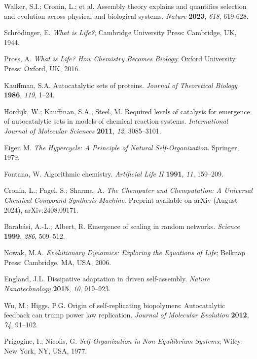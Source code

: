 \documentclass[preprint,12pt]{elsarticle}
\begin{document}
\begin{thebibliography}{999}
Walker, S.I.; Cronin, L.; et al. Assembly theory explains and quantifies selection and evolution across physical and biological systems. \textit{Nature} \textbf{2023}, \textit{618}, 619-628.

Schrödinger, E. \textit{What is Life?}; Cambridge University Press: Cambridge, UK, 1944.

Pross, A. \textit{What is Life? How Chemistry Becomes Biology}; Oxford University Press: Oxford, UK, 2016.

Kauffman, S.A. Autocatalytic sets of proteins. \textit{Journal of Theoretical Biology} \textbf{1986}, \textit{119}, 1–24.

Hordijk, W.; Kauffman, S.A.; Steel, M. Required levels of catalysis for emergence of autocatalytic sets in models of chemical reaction systems. \textit{International Journal of Molecular Sciences} \textbf{2011}, \textit{12}, 3085–3101.

Eigen M. \textit{The Hypercycle: A Principle of Natural Self-Organization.} Springer, 1979.

Fontana, W. Algorithmic chemistry. \textit{Artificial Life II} \textbf{1991}, \textit{11}, 159–209.

Cronin, L.; Pagel, S.; Sharma, A. \textit{The Chemputer and Chemputation: A Universal Chemical Compound Synthesis Machine}. Preprint available on arXiv (August 2024), arXiv:2408.09171.

Barabási, A.-L.; Albert, R. Emergence of scaling in random networks. \textit{Science} \textbf{1999}, \textit{286}, 509–512.

Nowak, M.A. \textit{Evolutionary Dynamics: Exploring the Equations of Life}; Belknap Press: Cambridge, MA, USA, 2006.

England, J.L. Dissipative adaptation in driven self-assembly. \textit{Nature Nanotechnology} \textbf{2015}, \textit{10}, 919–923.

Wu, M.; Higgs, P.G. Origin of self-replicating biopolymers: Autocatalytic feedback can trump power law replication. \textit{Journal of Molecular Evolution} \textbf{2012}, \textit{74}, 91–102.

Prigogine, I.; Nicolis, G. \textit{Self-Organization in Non-Equilibrium Systems}; Wiley: New York, NY, USA, 1977.


\end{thebibliography}
\end{document}

